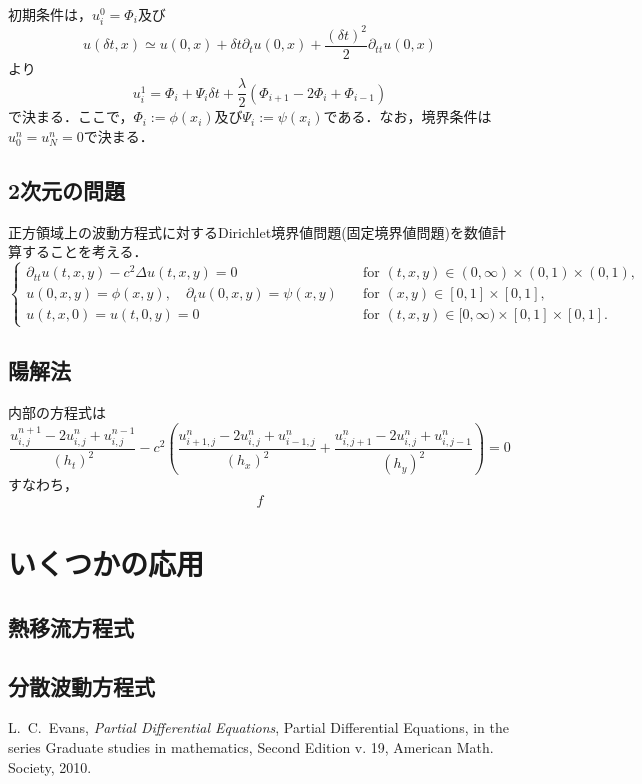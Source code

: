 初期条件は，$u^{0}_{i}=\Phi_{i}$及び
$$
u(\delta t,x)\simeq u(0,x)+\delta t\partial_{t}u(0,x)+\frac{(\delta t)^{2}}{2}\partial_{tt}u(0,x)
$$
より
$$
u^{1}_{i}=\Phi_{i}+\Psi_{i}\delta t+\frac{\lambda}{2}(\Phi_{i+1}-2\Phi_{i}+\Phi_{i-1})
$$
で決まる．ここで，$\Phi_{i}:=\phi(x_i)$及び$\Psi_{i}:=\psi(x_i)$である．なお，境界条件は$u^{n}_{0}=u^{n}_{N}=0$で決まる．

\subsection{2次元の問題}
正方領域上の波動方程式に対するDirichlet境界値問題(固定境界値問題)を数値計算することを考える．
\begin{equation}
\label{e:wave2d}
	\begin{cases}
		\partial_{tt}u(t,x,y)-c^{2}\Delta u(t,x,y)=0\quad&\text{for $(t,x,y)\in(0,\infty)\times(0,1)\times(0,1)$,}\\
		u(0,x,y)=\phi(x,y),\quad \partial_{t}u(0,x,y)=\psi(x,y)\quad&\text{for $(x,y)\in[0,1]\times[0,1]$,}\\
		u(t,x,0)=u(t,0,y)=0\quad&\text{for $(t,x,y)\in[0,\infty)\times[0,1]\times[0,1]$.}
	\end{cases}
\end{equation}

\subsection{陽解法}


内部の方程式は
$$
\frac{u^{n+1}_{i,j}-2u^{n}_{i,j}+u^{n-1}_{i,j}}{(h_{t})^{2}}-c^{2}\left(\frac{u^{n}_{i+1,j}-2u^{n}_{i,j}+u^{n}_{i-1,j}}{(h_x)^{2}}+\frac{u^{n}_{i,j+1}-2u^{n}_{i,j}+u^{n}_{i,j-1}}{(h_y)^{2}}\right)=0
$$
すなわち，
$$
f
$$




\section{いくつかの応用}
\subsection{熱移流方程式}
\subsection{分散波動方程式}





\begin{thebibliography}{99}
   L.~C.~Evans, \emph{Partial Differential Equations}, Partial Differential Equations, in the series Graduate studies in mathematics,
Second Edition v. 19, American Math. Society, 2010.
  \end{thebibliography}